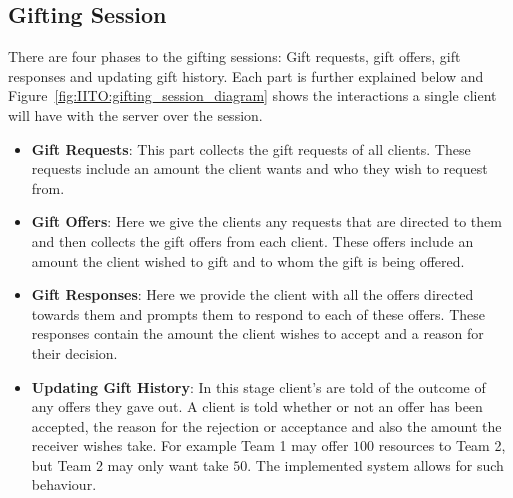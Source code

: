 \subsection{Gifting Session}
\label{subsec:IITO:gifting_session} 

There are four phases to the gifting sessions: Gift requests, gift offers, gift responses and updating gift history. Each part is further explained below and Figure~\ref{fig:IITO:gifting_session_diagram} shows the interactions a single client will have with the server over the session.
\begin{itemize}
    \item \textbf{Gift Requests}: This part collects the gift requests of all clients. These requests include an amount the client wants and who they wish to request from.
    \item \textbf{Gift Offers}: Here we give the clients any requests that are directed to them and then collects the gift offers from each client. These offers include an amount the client wished to gift and to whom the gift is being offered.
    \item \textbf{Gift Responses}: Here we provide the client with all the offers directed towards them and prompts them to respond to each of these offers. These responses contain the amount the client wishes to accept and a reason for their decision.
    \item \textbf{Updating Gift History}: In this stage client's are told of the outcome of any offers they gave out. A client is told whether or not an offer has been accepted, the reason for the rejection or acceptance and also the amount the receiver wishes take. For example Team 1 may offer $100$ resources to Team 2, but Team 2 may only want take $50$. The implemented system allows for such behaviour.
\end{itemize}


